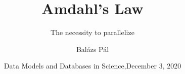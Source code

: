 \title[Amdahl's Law]
{Amdahl's Law}

\subtitle{The necessity to parallelize}

\author[Balázs Pál]
{Balázs Pál}


\date[ELTE 2020]
{Data Models and Databases in Science,\newline December 3, 2020}

